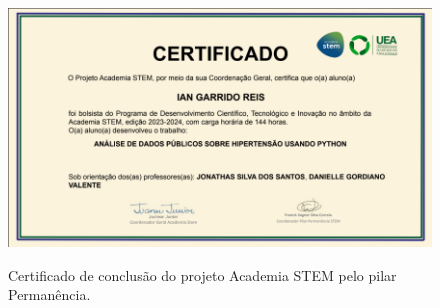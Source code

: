 \documentclass[12pt]{article}
\begin{document}
    \begin{figure}
        \centering
        \caption{Certificado de conclusão do projeto Academia STEM pelo pilar Permanência.}
        \includegraphics[width=0.8\linewidth]{figures/certificado.png}
        \label{fig:figura10}
    \end{figure}
\end{document}
